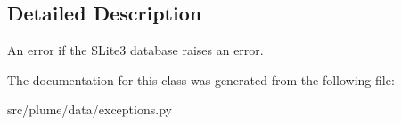 \subsection{Detailed Description}
An error if the S\+Lite3 database raises an error. 

The documentation for this class was generated from the following file\+:\begin{DoxyCompactItemize}
\item 
src/plume/data/exceptions.\+py\end{DoxyCompactItemize}
